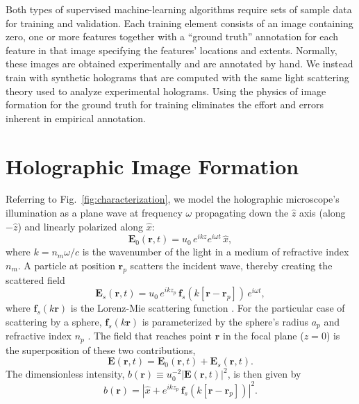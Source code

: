\documentclass[10pt,letterpaper]{article}
\renewcommand{\vec}[1]{\mathbf{#1}}
\newcommand{\abs}[1]{\left\vert #1 \right\vert}
\begin{document}
Both types of supervised machine-learning algorithms 
require sets of sample data for training and validation.
Each training element
consists of an image containing
zero, one or more features together with
a ``ground truth'' annotation for each feature in that image
specifying the features' locations and extents.
Normally, these images are obtained experimentally
and are annotated by hand.
We instead train with synthetic holograms that are 
computed with the same light scattering theory \cite{lee07a}
used to analyze experimental holograms.
Using the physics of image formation
for the ground truth for training eliminates 
the effort and errors inherent in empirical annotation.

\section{Holographic Image Formation}

Referring to Fig.~\ref{fig:characterization}, we model the 
holographic microscope's illumination as a
plane wave at frequency $\omega$ propagating down the $\hat{z}$ 
axis (along $-\hat{z}$) and linearly polarized along $\hat{x}$:
\begin{equation}
  \label{eq:incidentwave}
  \vec{E}_0(\vec{r},t)
  =
  u_0 \, e^{i k z} e^{i \omega t} \, \hat{x},
\end{equation}
where $k = n_m \omega/c$ is the wavenumber of the light
in a medium of refractive index $n_m$. A particle at position 
$\vec{r}_p$
scatters the incident wave, thereby creating the scattered field
\begin{equation}
  \label{eq:scatteredwave}
  \vec{E}_s(\vec{r},t)
  =
  u_0 \, e^{i k z_p} \, \vec{f}_s(k[\vec{r} - \vec{r}_p]) \, e^{i \omega t},
\end{equation}
where $\vec{f}_s(k\vec{r})$ is the Lorenz-Mie scattering 
function \cite{bohren83,mishchenko02}. For the particular case
of scattering by a sphere, $\vec{f}_s(k\vec{r})$ is parameterized
by the sphere's radius $a_p$ and refractive index $n_p$ \cite{bohren83}.
The field that reaches point $\vec{r}$ in the focal plane 
($z = 0$) is the superposition of these two contributions,
\begin{equation}
  \label{eq:modelfield}
  \vec{E}(\vec{r},t) = \vec{E}_0(\vec{r},t) + \vec{E}_s(\vec{r},t).
\end{equation}
The dimensionless intensity,
$b(\vec{r}) \equiv u_0^{-2} \abs{\vec{E}(\vec{r},t)}^2$,  
is then given by
\begin{equation}
  \label{eq:modelintensity}
  b(\vec{r})
  =
  \abs{\hat{x} + e^{i k z_p} \, \vec{f}_s(k[\vec{r} - \vec{r}_p])}^2.
\end{equation}
\end{document}
